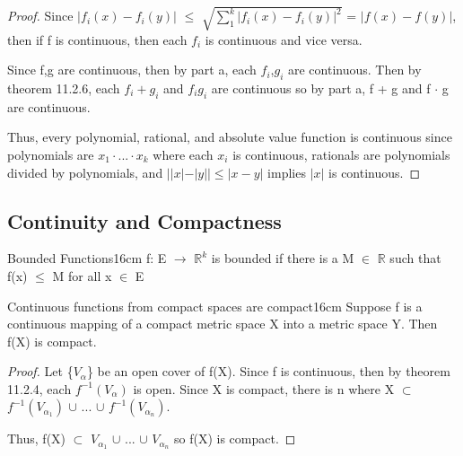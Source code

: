     \begin{proof}
        Since $|f_i(x) - f_i(y)|$
        $\leq$ $\sqrt{\sum_1^k |f_i(x) - f_i(y)|^2}$
        = $|f(x) - f(y)|$, then if f is continuous, then
        each $f_i$ is continuous and vice versa.

        \vspace{0.2cm}

        Since f,g are continuous, then by part a, each $f_i$,$g_i$ are continuous.
        Then by {\color{red} theorem 11.2.6},
        each $f_i + g_i$ and $f_i g_i$ are continuous so
        by part a, f + g and f $\cdot$ g are continuous.

        \vspace{0.2cm}

        Thus, every polynomial, rational, and absolute value function is continuous
        since polynomials are $x_1 \cdot ... \cdot x_k$ where each $x_i$
        is continuous, rationals are polynomials divided by polynomials,
        and $||x| - |y|| \leq |x - y|$ implies $|x|$ is continuous.
    \end{proof}

    \newpage





\subsection{ Continuity and Compactness }

    \begin{definition}{Bounded Functions}{16cm}
        f: E $\rightarrow$ $\mathbb{R}^k$ is {\color{lblue} bounded} if there is a
        M $\in$ $\mathbb{R}$ such that f(x) $\leq$ M for all x $\in$ E     
    \end{definition}

    \vspace{0.5cm}



    \begin{wtheorem}{Continuous functions from compact spaces are compact}{16cm}
        Suppose f is a continuous mapping of a compact metric space X
        into a metric space Y. Then f(X) is compact.        
    \end{wtheorem}

    \begin{proof}
        Let \{$V_{\alpha}$\} be an open cover of f(X).
        Since f is continuous, then by {\color{red} theorem 11.2.4},
        each $f^{-1}(V_{\alpha})$ is open.
        Since X is compact, there is n where
        X $\subset$ $f^{-1}(V_{\alpha_1})$ $\cup$ ... $\cup$ $f^{-1}(V_{\alpha_n})$.

        Thus, f(X) $\subset$ $V_{\alpha_1}$ $\cup$ ... $\cup$ $V_{\alpha_n}$
        so f(X) is compact.
    \end{proof}




